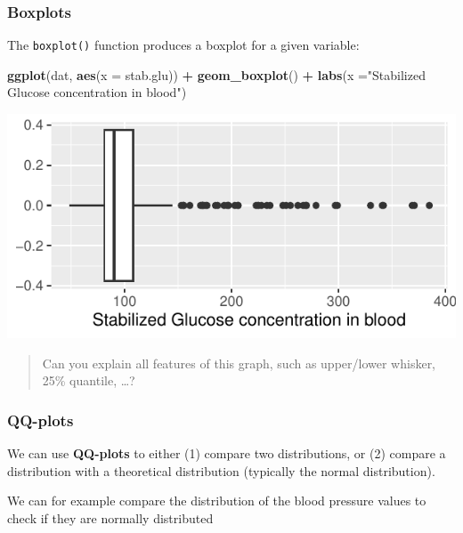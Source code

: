 \documentclass[
]{book}
\newenvironment{Shaded}{\begin{snugshade}}{\end{snugshade}}
\newcommand{\AttributeTok}[1]{\textcolor[rgb]{0.13,0.29,0.53}{#1}}
\newcommand{\FunctionTok}[1]{\textcolor[rgb]{0.13,0.29,0.53}{\textbf{#1}}}
\newcommand{\NormalTok}[1]{#1}
\newcommand{\SpecialCharTok}[1]{\textcolor[rgb]{0.81,0.36,0.00}{\textbf{#1}}}
\newcommand{\StringTok}[1]{\textcolor[rgb]{0.31,0.60,0.02}{#1}}
\begin{document}
\hypertarget{boxplots}{%
\subsubsection{Boxplots}\label{boxplots}}

The \texttt{boxplot()} function produces a boxplot for a given variable:

\begin{Shaded}
\begin{Highlighting}[]
\FunctionTok{ggplot}\NormalTok{(dat,}
       \FunctionTok{aes}\NormalTok{(}\AttributeTok{x =}\NormalTok{ stab.glu)) }\SpecialCharTok{+}
  \FunctionTok{geom\_boxplot}\NormalTok{() }\SpecialCharTok{+}
  \FunctionTok{labs}\NormalTok{(}\AttributeTok{x =}\StringTok{"Stabilized Glucose concentration in blood"}\NormalTok{)}
\end{Highlighting}
\end{Shaded}

\includegraphics{_main_files/figure-latex/unnamed-chunk-49-1.pdf}

\begin{quote}
Can you explain all features of this graph, such as upper/lower whisker, 25\% quantile, \ldots?
\end{quote}

\hypertarget{qq-plots}{%
\subsubsection{QQ-plots}\label{qq-plots}}

We can use \textbf{QQ-plots} to either (1) compare two distributions, or (2) compare a distribution with a theoretical distribution (typically the normal distribution).

We can for example compare the distribution of the blood pressure values to check if they are normally distributed
\end{document}
